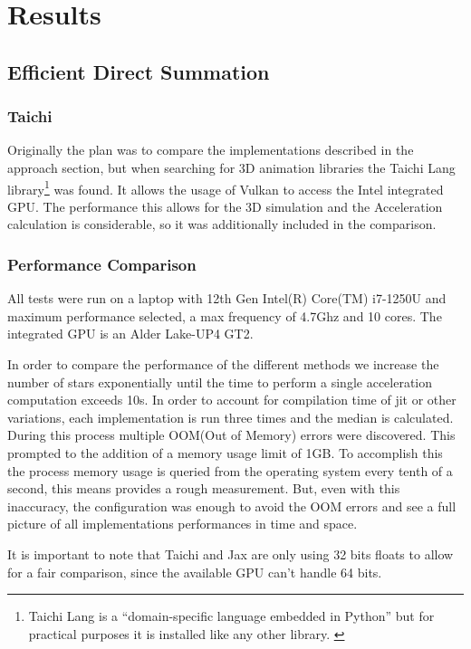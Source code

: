 \documentclass[a4paper, 11pt]{article}         %
\begin{document}
\section{Results}

\subsection{Efficient Direct Summation}
\subsubsection{Taichi}
Originally the plan was to compare the implementations described in the approach section, but when searching for 3D animation libraries the 
Taichi Lang library\footnote{Taichi Lang is a ``domain-specific language embedded in Python'' but for practical purposes it is installed like any other library. \parencite{TaichiLang}}
 was found. It allows the usage of Vulkan\parencite{Vulkan} to access the Intel integrated GPU.
The performance this allows for the 3D simulation and the Acceleration calculation is considerable, so it was additionally included in the comparison. 

\subsubsection{Performance Comparison}

All tests were run on a laptop with 12th Gen Intel(R) Core(TM) i7-1250U and maximum performance selected, a max frequency of 4.7Ghz and 10 cores. The integrated GPU is an Alder Lake-UP4 GT2.

In order to compare the performance of the different methods we increase the number of stars exponentially until the time to perform a single acceleration computation 
exceeds 10s. In order to account for compilation time of jit or other variations, each implementation is run three times and the median is calculated.
During this process multiple OOM(Out of Memory) errors were discovered.
This prompted to the addition of a memory usage limit of 1GB. To accomplish this the process memory usage is queried from the operating system every tenth of a second, this means provides a rough measurement.
But, even with this inaccuracy, the configuration was enough to avoid the OOM errors and see a full picture of all implementations performances in time and space.

It is important to note that Taichi and Jax are only using 32 bits floats to allow for a fair comparison, since the available GPU can't handle 64 bits.
\end{document}
